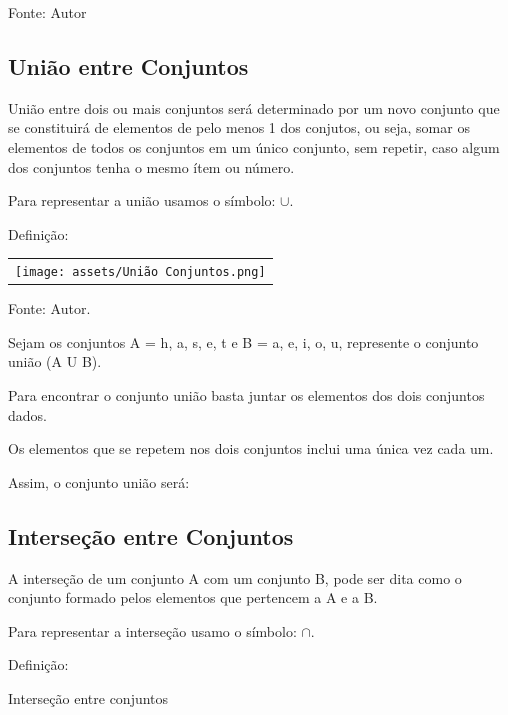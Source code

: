 \begin{multicols*}{2}
			Fonte: Autor\\
		        
        \subsection{União entre Conjuntos}
        
        União entre dois ou mais conjuntos será determinado por um novo conjunto que se constituirá de elementos de pelo menos 1 dos conjutos, ou seja, somar os elementos de todos os conjuntos em um único conjunto, sem repetir, caso algum dos conjuntos tenha o mesmo ítem ou número.
        
        Para representar a união usamos o símbolo: $ \mathbf{ \cup } $.
        
        Definição:
        
        
        	\begin{tabular}{@{}c@{}}
      		\texttt{[image: assets/União Conjuntos.png]}
    		\end{tabular}
    
		Fonte: Autor.
		
		Sejam os conjuntos A = {h, a, s, e, t} e B = {a, e, i, o, u}, represente o conjunto união (A U B).

		Para encontrar o conjunto união basta juntar os elementos dos dois conjuntos dados.
		
		Os elementos que se repetem nos dois conjuntos inclui uma única vez cada um.

		Assim, o conjunto união será:


        \subsection{Interseção entre Conjuntos}
        
        A interseção de um conjunto A com um conjunto B, pode ser dita como o conjunto formado pelos elementos que pertencem a A e a B.
		        
        Para representar a interseção usamo o símbolo: $ \cap $.
        
        Definição:
        
		
		Interseção entre conjuntos\\
		

\end{multicols*}
